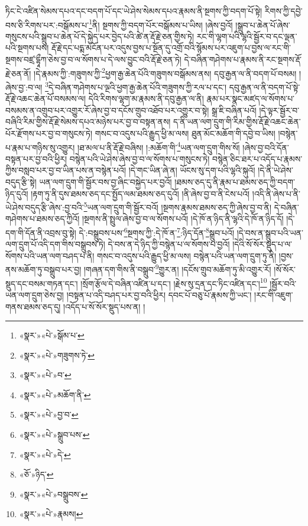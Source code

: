 ཏིང་ངེ་འཛིན་སེམས་དཔའ་དང་བདག་པོ་དང་ཡེ་ཤེས་སེམས་དཔའ་རྣམས་ནི་སྔགས་ཀྱི་བདག་པོ་སྟེ། རིགས་ཀྱི་དབྱེ་བས་ཅི་རིགས་པར་:བསྒོམས་པ་\footnote{«སྣར་»«པེ་»སྒོམ་པ་}ནི། སྔགས་ཀྱི་བདག་པོར་བསྒོམས་པ་ཡིས། །ཞེས་བྱའོ། །སྒྲུབ་པ་ཆེན་པོ་ཞེས་གསུངས་པའི་སྒྲུབ་པ་ཆེན་པོ་དེ་སྐྱེད་པར་བྱེད་པའི་ཚེ་ན་རྡོ་རྗེ་ཅན་གྱིས་ཏེ། རང་གི་ལྷག་པའི་ལྷའི་སྦྱོར་བ་དང་ལྡན་པའི་སྔགས་པས། རྡོ་རྗེ་དང་པདྨ་མངོན་པར་འདུས་བྱས་པ་སྔོན་དུ་འགྲོ་བའི་སྙོམས་པར་འཇུག་པ་བྱས་ལ་རང་གི་སྔགས་བཛྲ་དྷཱྀཀ་ཅེས་བྱ་བ་ལ་སོགས་པ་དེ་ལས་བྱུང་བའི་རྡོ་རྗེ་ཅན་ཏེ། དེ་བཞིན་གཤེགས་པ་རྣམས་ནི་རང་སྔགས་རྡོ་རྗེ་ཅན་ནོ། །དེ་རྣམས་ཀྱི་:གཟུགས་ཀྱི་\footnote{«སྣར་»«པེ་»གཟུགས་ཏེ་}ཕྱག་རྒྱ་ཆེན་པོའི་གཟུགས་བསྒོམས་ནས། དབུ་རྒྱན་ལ་ནི་བདག་པོ་བསམ། །ཞེས་བྱ་:བ་ལ། \footnote{«སྣར་»«པེ་»བ་}དེ་བཞིན་གཤེགས་པ་ལྔའི་ཕྱག་རྒྱ་ཆེན་པོའི་གཟུགས་ཀྱི་རལ་པ་དང་། དབུ་རྒྱན་ལ་ནི་བདག་པོ་སྟེ་རྡོ་རྗེ་འཆང་ཆེན་པོ་བསམས་ལ། དེའི་རིགས་ལྷག་མ་རྣམས་ནི་དབུ་རྒྱན་ལ་ནི། རྣམ་པར་སྣང་མཛད་ལ་སོགས་པ་བསམས་ན་འགྲུབ་པར་འགྱུར་རོ་ཞེས་བྱ་བ་དངོས་གྲུབ་འཐོབ་པར་འགྱུར་བ་སྟེ། སྒྲ་ཇི་བཞིན་པའོ། །དེ་ལྟར་སྦྱོར་བ་བཞིའི་རིམ་གྱིས་རྡོ་རྗེ་སེམས་དཔའ་མཉེས་པར་བྱ་བ་བསྟན་ནས། ད་ནི་ཡན་ལག་དྲུག་གི་རིམ་གྱིས་རྡོ་རྗེ་འཆང་ཆེན་པོར་རྫོགས་པར་བྱ་བ་གསུངས་ཏེ། གསང་བ་འདུས་པའི་རྒྱུད་ཕྱི་མ་ལས། ཐུན་མོང་མཆོག་གི་དབྱེ་བ་ཡིས། །བསྙེན་པ་རྣམ་པ་གཉིས་སུ་འགྱུར། །ཐ་མལ་པ་ནི་རྡོ་རྗེ་བཞིས། །:མཆོག་གི་\footnote{«སྣར་»«པེ་»མཆོག་ནི་}ཡན་ལག་དྲུག་གིས་སོ། །ཞེས་བྱ་བའི་དོན་བསྟན་པར་བྱ་བའི་ཕྱིར། བསྙེན་པའི་ཡེ་ཤེས་ཞེས་བྱ་བ་ལ་སོགས་པ་གསུངས་ཏེ། བསྙེན་ཅིང་ཐར་པ་འདོད་པ་རྣམས་ཀྱིས་བསླབ་པར་བྱ་བ་ཡིན་པས་ན་བསྙེན་པའོ། །དེ་གང་ཡིན་ཞེ་ན། ཡོངས་སུ་དག་པའི་ལྷའི་སྐུའོ། །དེ་ནི་ཡེ་ཤེས་བདུད་རྩི་སྟེ། ཡན་ལག་དྲུག་གི་སྦྱོར་བས་བྱ་ཞིང་བསྐྱེད་པར་བྱའོ། །ཐམས་ཅད་དུ་ནི་རྣམ་པ་ཐམས་ཅད་ཀྱི་བདག་ཉིད་དུའོ། །རྟག་ཏུ་ནི་དུས་ཐམས་ཅད་དང་སྤྱོད་ལམ་ཐམས་ཅད་དུའོ། །ནི་ཞེས་བྱ་བ་ནི་ངེས་པའོ། །འདི་ནི་ཞེས་པ་ནི་ཡེ་ཤེས་བདུད་རྩི་ཞེས་:བྱ་བའི་\footnote{«སྣར་»«པེ་»བྱ་བ་}ཡན་ལག་དྲུག་གི་སྦྱོར་བའོ། །སྔགས་རྣམས་ཐམས་ཅད་ཀྱི་ཞེས་བྱ་བ་ནི། དེ་བཞིན་གཤེགས་པ་ཐམས་ཅད་ཀྱིའོ། །སྔགས་ནི་སྤྲུལ་ཞེས་བྱ་བ་ལ་སོགས་པའོ། །དེ་ཁོ་ན་ཉིད་ནི་ལྷའི་དེ་ཁོ་ན་ཉིད་དོ། །དེ་དག་གི་དོན་ནི་འབྲས་བུ་སྟེ། དེ་:བསྒྲུབས་པས་\footnote{«སྣར་»«པེ་»སྒྲུབ་པས་}སྔགས་ཀྱི་:དེ་ཁོ་ན་\footnote{«སྣར་»«པེ་»དེ་}:ཉིད་དོན་\footnote{«ཅོ་»ཉིད་}སྒྲུབ་པའོ། །དེ་བས་ན་སྒྲུབ་པའི་ཡན་ལག་དྲུག་པོ་འདི་དག་གིས་བསྒྲུབས་ཏེ། དེ་བས་ན་དེ་ཉིད་ཀྱི་བསྙེན་པ་ལ་སོགས་པ་བྱའོ། །དེའི་སོ་སོར་སྡུད་པ་ལ་སོགས་པའི་ཡན་ལག་བཤད་པ་ནི། གསང་བ་འདུས་པའི་རྒྱུད་ཕྱི་མ་ལས། བསྙེན་པའི་ཡན་ལག་དྲུག་ཏུ་ནི། །བྱས་ནས་མཆོག་ཏུ་བསྒྲུབ་པར་བྱ། །གཞན་དག་གིས་ནི་བསྒྲུབ་\footnote{«སྣར་»«པེ་»བསྒྲུབས་}གྱུར་ན། །དངོས་གྲུབ་མཆོག་ཏུ་མི་འགྱུར་རོ། །སོ་སོར་སྡུད་དང་བསམ་གཏན་དང་། །སྲོག་རྩོལ་དེ་བཞིན་འཛིན་པ་དང་། །རྗེས་སུ་དྲན་དང་ཏིང་འཛིན་དང་།\footnote{«སྣར་»«པེ་»རྣམས།} །སྦྱོར་བའི་ཡན་ལག་དྲུག་ཅེས་བྱ། །བསྟན་པ་འདི་བཤད་པར་བྱ་བའི་ཕྱིར། དབང་པོ་བཅུ་པོ་རྣམས་ཀྱི་ཡང་། །རང་གི་འཇུག་གནས་ཐམས་ཅད་དུ། །འདོད་པ་སོ་སོར་སྡུད་པས་ན། །
